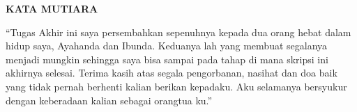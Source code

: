 
\clearpage
{}
{}
\begin{center}
    \textbf{\large KATA MUTIARA}\\[3em]
\end{center}


\begin{center}
    “Tugas Akhir ini saya persembahkan sepenuhnya kepada dua orang hebat dalam hidup saya, Ayahanda dan Ibunda. Keduanya lah yang membuat segalanya menjadi mungkin sehingga saya bisa sampai pada tahap di mana skripsi ini akhirnya selesai. Terima kasih atas segala pengorbanan, nasihat dan doa baik yang tidak pernah berhenti kalian berikan kepadaku. Aku selamanya bersyukur dengan keberadaan kalian sebagai orangtua ku.”
\end{center}

